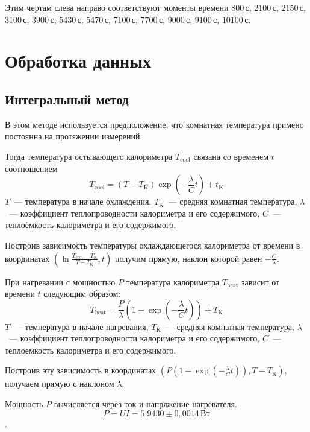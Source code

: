 \documentclass[a4paper, 12pt]{article}
\begin{document}
    Этим чертам слева направо соответствуют моменты времени $800\,\text{с}$,  $2100\,\text{с}$,
    $2150\,\text{с}$, $3100\,\text{с}$, $3900\,\text{с}$, $5430\,\text{с}$, $5470\,\text{с}$,
    $7100\,\text{с}$, $7700\,\text{с}$, $9000\,\text{с}$, $9100\,\text{с}$, $10100\,\text{с}$.

    \section{Обработка данных}
    \subsection{Интегральный метод}
    В этом методе используется предположение, что комнатная температура примено постоянна
    на протяжении измерений.

    Тогда температура остывающего калориметра $T_\text{cool}$ связана со временем $t$
    соотношением
    \[T_\text{cool}=(T-T_\text{K})\exp\left(-\frac{\lambda}{C}t\right)+t_\text{K}\]
    $T$~--- температура в начале охлаждения, $T_\text{K}$~--- средняя комнатная температура,
    $\lambda$~--- коэффициент теплопроводности калориметра и его содержимого, $C$~--- теплоёмкость  калориметра и его содержимого.

    Построив зависимость температуры охлаждающегося калориметра от времени в координатах
    $\left(\ln\frac{T_\text{cool}-T_\text{K}}{T-T_\text{K}},t\right)$ получим прямую,
    наклон которой равен $-\frac{C}{\lambda}$.

    При нагревании с мощностью $P$ температура калориметра $T_\text{heat}$ зависит от 
    времени $t$ следующим образом:
    \[T_\text{heat}=\frac{P}{\lambda}\left(1-\exp\left(-\frac{\lambda}{C}t\right)\right)+T_\text{K}\]
    $T$~--- температура в начале нагревания, $T_\text{K}$~--- средняя комнатная температура,
    $\lambda$~--- коэффициент теплопроводности калориметра и его содержимого, $C$~--- теплоёмкость  калориметра и его содержимого.

    Построив эту зависимость в координатах $\left(P\left(1-\exp\left(-\frac{\lambda}{C}t\right)\right), T-T_\text{K}\right)$,
    получаем прямую с наклоном $\lambda$.

    Мощность $P$ вычисляется через ток и напряжение нагревателя. $$P=UI=5{.}9430\pm0{,}0014\,\text{Вт}$$.
\end{document}
